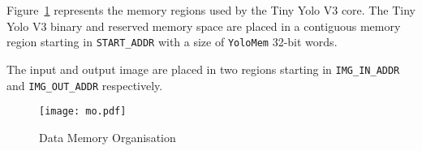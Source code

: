 \label{sec:mo}

Figure~\ref{fig:mo} represents the memory regions used by the Tiny Yolo V3 core.
The Tiny Yolo V3 binary and reserved memory space are placed in a contiguous 
memory region starting in \texttt{START\_ADDR} with a size of \texttt{YoloMem} 
32-bit words. 

The input and output image are placed in two regions starting in 
\texttt{IMG\_IN\_ADDR} and \texttt{IMG\_OUT\_ADDR} respectively.

\begin{figure}[!htbp]
    \centerline{\texttt{[image: mo.pdf]}}
    \vspace{0cm}\caption{Data Memory Organisation}
    \label{fig:mo}
\end{figure}


